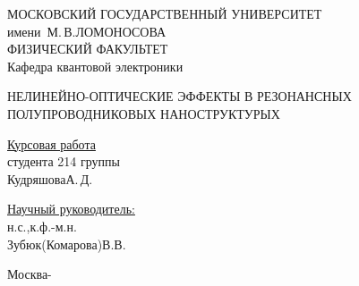 \begin{titlepage}

\begin{center}
\large
МОСКОВСКИЙ ГОСУДАРСТВЕННЫЙ УНИВЕРСИТЕТ\\
имени~М.\,В.\;ЛОМОНОСОВА\\
ФИЗИЧЕСКИЙ ФАКУЛЬТЕТ\\
Кафедра квантовой электроники
\end{center}

\vfill

\begin{center}
\large
НЕЛИНЕЙНО-ОПТИЧЕСКИЕ ЭФФЕКТЫ В РЕЗОНАНСНЫХ ПОЛУПРОВОДНИКОВЫХ НАНОСТРУКТУРЫХ
\end{center}

\vfill

\begin{flushright}
    \begin{minipage}{0.35\textwidth}
        \underline{Курсовая работа}\\
        студента 214 группы\\
        Кудряшова\;А.\,Д.
    \end{minipage}
\end{flushright}
\vspace*{6mm}
\begin{flushright}
    \begin{minipage}{0.35\textwidth}
        \underline{Научный руководитель:}
        \\н.с.,\;к.ф.-м.н.\\
        Зубюк(Комарова)\;В.В.\\
    \end{minipage}
\end{flushright}

\vfill

\centerline{Москва\;-}

\end{titlepage}